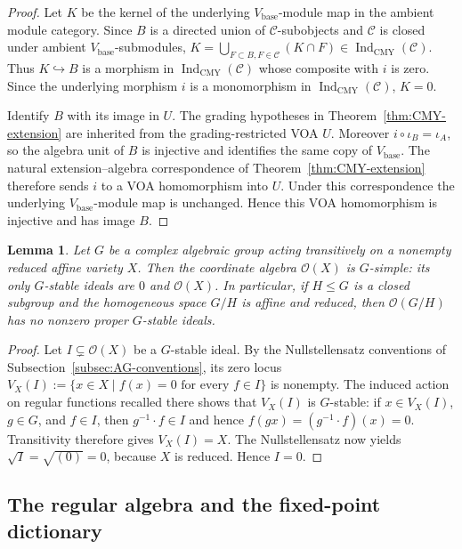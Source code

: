 \documentclass[12pt,leqno]{amsart}
\numberwithin{equation}{section} \newtheorem{thm}{Theorem}[section] \newtheorem{lem}[thm]{Lemma} \newtheorem{ex}[thm]{Example} \newtheorem{prop}[thm]{Proposition} \newtheorem{cor}[thm]{Corollary} \newtheorem{defi}[thm]{Definition} \newtheorem{rmk}[thm]{Remark} \newtheorem{notation}[thm]{Notation}
\newcommand{\OO}{\mathcal O}
\newcommand{\IndCMY}{\operatorname{Ind}_{\mathrm{CMY}}}
\begin{document}
\begin{proof}
Let $K$ be the kernel of the underlying $V_{\mathrm{base}}$-module map in the ambient module category. Since $B$ is a directed union of $\mathcal C$-subobjects and $\mathcal C$ is closed under ambient $V_{\mathrm{base}}$-submodules, \(K=\bigcup_{F\subset B,F\in\mathcal C}(K\cap F)\in\IndCMY(\mathcal C)\). Thus $K\hookrightarrow B$ is a morphism in $\IndCMY(\mathcal C)$ whose composite with $i$ is zero. Since the underlying morphism $i$ is a monomorphism in $\IndCMY(\mathcal C)$, $K=0$.

Identify $B$ with its image in $U$. The grading hypotheses in Theorem~\ref{thm:CMY-extension} are inherited from the grading-restricted VOA $U$. Moreover $i\circ\iota_B=\iota_A$, so the algebra unit of $B$ is injective and identifies the same copy of $V_{\mathrm{base}}$. The natural extension--algebra correspondence of Theorem~\ref{thm:CMY-extension} therefore sends $i$ to a VOA homomorphism into $U$. Under this correspondence the underlying $V_{\mathrm{base}}$-module map is unchanged. Hence this VOA homomorphism is injective and has image $B$.
\end{proof}

\begin{lem}\label{lem:G-simple-homogeneous}
Let $G$ be a complex algebraic group acting transitively on a nonempty reduced affine variety $X$. Then the coordinate algebra $\OO(X)$ is $G$-simple: its only $G$-stable ideals are $0$ and $\OO(X)$. In particular, if $H\le G$ is a closed subgroup and the homogeneous space $G/H$ is affine and reduced, then $\OO(G/H)$ has no nonzero proper $G$-stable ideals.
\end{lem}

\begin{proof}
Let $I\subsetneq\OO(X)$ be a $G$-stable ideal. By the Nullstellensatz conventions of Subsection~\ref{subsec:AG-conventions}, its zero locus \(V_X(I):=\{x\in X\mid f(x)=0\text{ for every }f\in I\}\) is nonempty. The induced action on regular functions recalled there shows that $V_X(I)$ is $G$-stable: if $x\in V_X(I)$, $g\in G$, and $f\in I$, then $g^{-1}\cdot f\in I$ and hence \(f(gx)=(g^{-1}\cdot f)(x)=0\). Transitivity therefore gives $V_X(I)=X$. The Nullstellensatz now yields \(\sqrt I=\sqrt{(0)}=0\), because $X$ is reduced. Hence $I=0$.
\end{proof}

\subsection{The regular algebra and the fixed-point dictionary}
\end{document}
